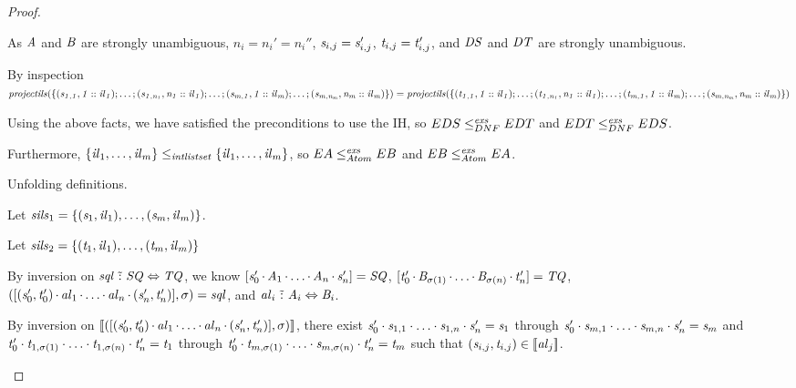 \documentclass[acmsmall]{acmart}
\begin{document}
\begin{proof}
\begin{case}
    As $\mathit{A}$ and $\mathit{B}$ are strongly unambiguous, $n_i = n_i' =
    n_i''$, $\mathit{s}_{i,j} = \mathit{s}_{i,j}'$, $\mathit{t}_{i,j} =
    \mathit{t}_{i,j}'$, and $\mathit{DS}$ and $\mathit{DT}$ are strongly unambiguous.

    By inspection $\mathit{\mathit{projectils}(\{(\mathit{s}_{1,1},1::\mathit{il}_1);\ldots;(\mathit{s}_{1,n_1},n_1::\mathit{il}_1);
      \ldots;(\mathit{s}_{m,1},1::\mathit{il}_m);\ldots;(\mathit{s}_{m,n_m},n_m::\mathit{il}_m)\})}
    = \mathit{\mathit{projectils}(\{(\mathit{t}_{1,1},1::\mathit{il}_1);\ldots;(\mathit{t}_{1,n_1},n_1::\mathit{il}_1);
        \ldots;(\mathit{t}_{m,1},1::\mathit{il}_m);\ldots;(\mathit{s}_{m,n_m},n_m::\mathit{il}_m)\})}$

    Using the above facts, we have satisfied the preconditions to use the IH, so
    $EDS \leq_{DNF}^{\mathit{exs}} EDT$ and
    $EDT \leq_{DNF}^{\mathit{exs}} EDS$.

    Furthermore, $\{\mathit{il}_1,\ldots,\mathit{il}_m\} \leq_{\mathit{intlistset}}
    \{\mathit{il}_1,\ldots,\mathit{il}_m\}$, so
    $EA \leq_{Atom}^{\mathit{exs}} EB$ and
    $EB \leq_{Atom}^{\mathit{exs}} EA$.
  \end{case}

  \begin{case}
    Unfolding definitions.

    Let $\mathit{sils}_1 =
    \{(\mathit{s}_1,\mathit{il}_1),\ldots,(\mathit{s}_m,\mathit{il}_m)\}$.

    Let
    $\mathit{sils}_2 =
    \{(\mathit{t}_1,\mathit{il}_1),\ldots,(\mathit{t}_m,\mathit{il}_m)\}$

    By inversion on $\mathit{sql} \,\,\tilde{:}\,\, \mathit{SQ} \Leftrightarrow
    \mathit{TQ}$, we know
    $[\mathit{s}_0' \mkern-1mu\cdot\mkern-1mu \mathit{A}_1 \mkern-1mu\cdot\mkern-1mu \ldots \mkern-1mu\cdot\mkern-1mu \mathit{A}_n
      \mkern-1mu\cdot\mkern-1mu \mathit{s}_n'] = \mathit{SQ}$,
    $[\mathit{t}_0' \mkern-1mu\cdot\mkern-1mu \mathit{B}_{\sigma(1)} \mkern-1mu\cdot\mkern-1mu \ldots \mkern-1mu\cdot\mkern-1mu \mathit{B}_{\sigma(n)}
      \mkern-1mu\cdot\mkern-1mu \mathit{t}_n'] = \mathit{TQ}$,
    $([(\mathit{s}_0',\mathit{t}_0') \mkern-1mu\cdot\mkern-1mu \mathit{al}_1 \mkern-1mu\cdot\mkern-1mu
      \ldots \mkern-1mu\cdot\mkern-1mu \mathit{al}_n \mkern-1mu\cdot\mkern-1mu (\mathit{s}_n',\mathit{t}_n')], \sigma)
    = \mathit{sql}$, and $\mathit{al}_i
    \,\,\tilde{:}\,\, \mathit{A}_i \Leftrightarrow \mathit{B}_i$.

    By inversion on $[ \! [([(\mathit{s}_0',\mathit{t}_0') \mkern-1mu\cdot\mkern-1mu \mathit{al}_1 \mkern-1mu\cdot\mkern-1mu
      \ldots \mkern-1mu\cdot\mkern-1mu \mathit{al}_n \mkern-1mu\cdot\mkern-1mu (\mathit{s}_n',\mathit{t}_n')],
    \sigma)] \! ]$,
    there exist
    $\mathit{s}_0'\cdot\mathit{s}_{1,1}\cdot\ldots\cdot\mathit{s}_{1,n}\cdot\mathit{s}_n' = \mathit{s}_1$ through
    $\mathit{s}_0'\cdot\mathit{s}_{m,1}\cdot\ldots\cdot\mathit{s}_{m,n}\cdot\mathit{s}_n' = \mathit{s}_m$ and
    $\mathit{t}_0'\cdot\mathit{t}_{1,\sigma(1)}\cdot\ldots\cdot\mathit{t}_{1,\sigma(n)}\cdot\mathit{t}_n' = \mathit{t}_1$ through
    $\mathit{t}_0'\cdot\mathit{t}_{m,\sigma(1)}\cdot\ldots\cdot\mathit{s}_{m,\sigma(n)}\cdot\mathit{t}_n' = \mathit{t}_m$ such that
    $(\mathit{s}_{i,j},\mathit{t}_{i,j}) \in [ \! [\mathit{al}_j] \! ]$.


\end{case}
\end{proof}
\end{document}
